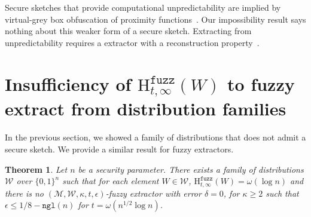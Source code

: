 \documentclass[11pt]{article}
\newcommand{\zo}{\ensuremath{\{0, 1\}}}
\newcommand{\ngl}{\ensuremath{\mathtt{ngl}}\xspace}
\newcommand{\Hfuzz}{\mathrm{H}^{\mathtt{fuzz}}_{t,\infty}}
\newtheorem{theorem}{Theorem}[section]
\begin{document}
Secure sketches that provide computational unpredictability are implied by virtual-grey box obfuscation of proximity functions~\cite{BitanskyCKP14}.  Our impossibility result says nothing about this weaker form of a secure sketch.  Extracting from unpredictability requires a extractor with a reconstruction property~\cite{barak-computational, DBLP:conf/eurocrypt/HsiaoLR07}.

\section{Insufficiency of $\Hfuzz(W)$ to fuzzy extract from distribution families}
\label{sec:imposs fuzz ext}
In the previous section, we showed a family of distributions that does not admit a secure sketch.  We provide a similar result for fuzzy extractors.  

\begin{theorem}
\label{thm:imposs fuzz ext}
Let $n$ be a security parameter.  There exists a family of distributions $\mathcal{W}$ over $\zo^n$ such that for each element $W\in \mathcal{W}$, $\Hfuzz(W)= \omega(\log n)$ and there is no $(\mathcal{M}, \mathcal{W}, \kappa, t, \epsilon)$-fuzzy extractor with error $\delta = 0$, for $\kappa \ge 2$ such that $\epsilon \le 1/8 - \ngl(n)$ for $t = \omega(n^{1/2}\log n)$. \end{theorem}
\end{document}
